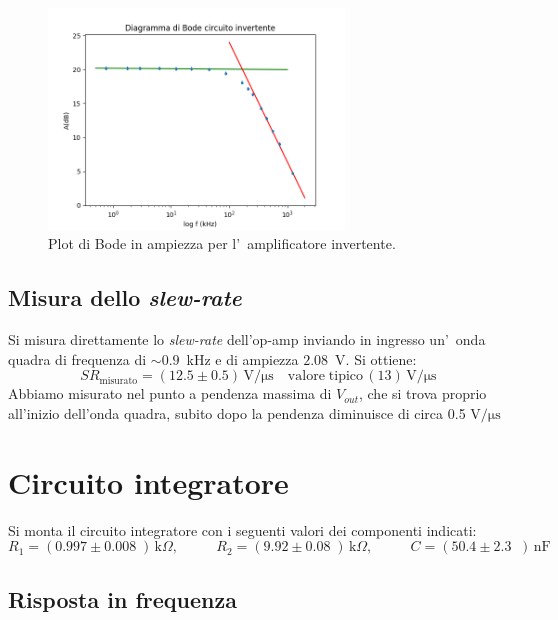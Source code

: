 \documentclass[10pt,a4paper]{article}
\newcommand{\exn}{\phantom{xxx}}
\begin{document}
\begin{table}[h]
\begin{center}
\begin{tabular}{|c|c|c|}
				\hline
			\end{tabular}
		\end{center}
	\end{table} 
	
	
	
	\begin{figure}[h]
		\begin{center}
			
			\includegraphics[width=0.7\textwidth]{bodeInvertente}
			\caption{\small Plot di Bode in ampiezza per l'~amplificatore invertente.}
			\label{fig:bodeinv}
		\end{center}
	\end{figure}
	\subsection{Misura dello \emph{slew-rate}}
	Si misura direttamente lo \emph{slew-rate} dell'op-amp inviando in ingresso un'~onda quadra 
	di frequenza di $\sim 0.9$~kHz e di ampiezza $2.08$~V. Si ottiene:
	\[
	SR_\mathrm{misurato} = (12.5 \pm 0.5 )\,\mathrm{V/\mu s} \quad \mathrm{valore \; tipico}\, (13 )\,\mathrm{V/\mu s}\
	\]
Abbiamo misurato nel  punto a pendenza massima di $V_{out}$, che si trova proprio all'inizio dell'onda quadra, subito dopo la pendenza diminuisce di circa 0.5 $ \mathrm{V/\mu s}$

	\section{Circuito integratore}
	Si monta il circuito integratore con i seguenti valori  dei componenti indicati: 
	\[
	R_1 = (0.997 \pm 0.008 \;) \,\mathrm{k}\Omega, \:\:\;\:\exn 
	R_2 = (9.92 \pm 0.08 \;) \,\mathrm{k}\Omega, \:\:\;\:\exn 
	C = (50.4 \pm 2.3 \;\;)\,\mathrm{nF}
	\]
	
	\subsection{Risposta in frequenza}
	
\end{document}
